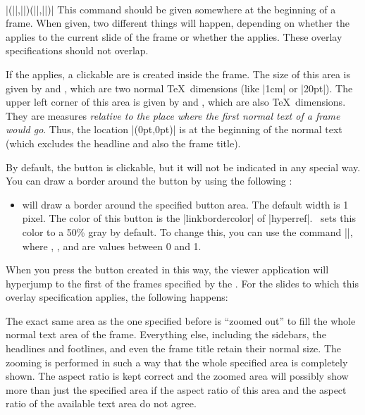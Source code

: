 \begin{command}{\framezoom{}\\|(||,||)(||,||)|}
  This command should be given somewhere at the beginning of a
  frame. When given, two different things will happen, depending on
  whether the  applies to the
  current slide of the frame or whether the  applies. These overlay specifications should not
  overlap.

  If the  applies, a clickable are
  is created inside the frame. The size of this area is given by
   and , which are two
  normal \TeX\ dimensions (like |1cm| or |20pt|). The upper left
  corner of this area is given by  and , which are also \TeX\ dimensions. They are measures
  \emph{relative to the place where the first normal text of a
    frame would go}. Thus, the location |(0pt,0pt)| is at the
  beginning of the normal text (which excludes the headline and also
  the frame title).

  By default, the button is clickable, but it will not be indicated in
  any special way. You can draw a border around the button by using
  the following :
  \begin{itemize}
  \item {} will draw
    a border around the specified button area. The default width is 1
    pixel. The color of this  button is the |linkbordercolor| of
    |hyperref|. \beamer\ sets this color to a 50\% gray by default. To
    change this, you can use the command
    ||, 
    where , , and  are values between
    0 and 1.
  \end{itemize}

  When you press the button created in this way, the viewer
  application will hyperjump to the first of the frames specified by
  the . For the slides to which
  this overlay specification applies, the following happens:

  The exact same area as the one specified before is ``zoomed out'' to
  fill the whole normal text area of the frame. Everything else,
  including the sidebars, the headlines and footlines, and even the
  frame title retain their normal size. The zooming is performed in
  such a way that the whole specified area is completely shown. The
  aspect ratio is kept correct and the zoomed area will possibly show
  more than just the specified area if the aspect ratio of this area
  and the aspect ratio of the available text area do not agree.


\end{command}
